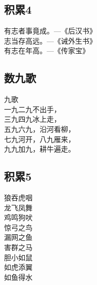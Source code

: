 \subsection{积累4}
\begin{pinyinscope}
	\huge
	\noindent 有志者事竟成。---{\kaishu \large 《后汉书》}\\
	志当存高远。---{\kaishu \large 《诫外生书》}\\
	有志在年高。---{\kaishu \large 《传家宝》}\\
\end{pinyinscope}

\subsection{数九歌}
\begin{pinyinscope}
	\huge
	\noindent {}九歌\\
	
	\noindent 一九二九不出手，\\
	三九四九冰上走，\\
	五九六九，沿河看柳，\\
	七九河开，八九雁来，\\
	九九加九，耕牛遍走。
\end{pinyinscope}

\subsection{积累5}
\begin{pinyinscope}
	\huge
	\noindent 狼吞虎咽\\
	龙飞凤舞\\
	鸡鸣狗吠\\
	惊弓之鸟\\
	漏网之鱼\\
	害群之马\\
	胆小如鼠\\
	如虎添翼\\
	如鱼得水
\end{pinyinscope}